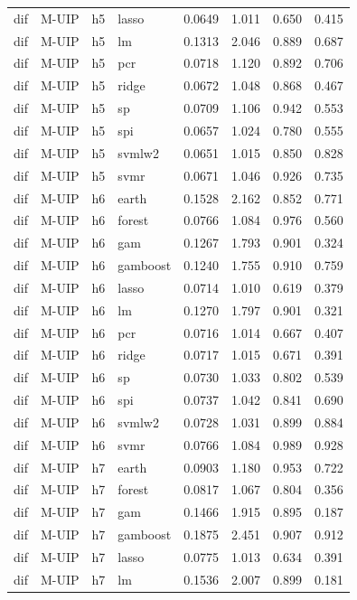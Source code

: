 \begin{ThreePartTable}
\begin{longtable}[t]{llclcccc}
dif & M-UIP & h5 & lasso & 0.0649 & 1.011 & 0.650 & 0.415\\
dif & M-UIP & h5 & lm & 0.1313 & 2.046 & 0.889 & 0.687\\
dif & M-UIP & h5 & pcr & 0.0718 & 1.120 & 0.892 & 0.706\\
dif & M-UIP & h5 & ridge & 0.0672 & 1.048 & 0.868 & 0.467\\
dif & M-UIP & h5 & sp & 0.0709 & 1.106 & 0.942 & 0.553\\
dif & M-UIP & h5 & spi & 0.0657 & 1.024 & 0.780 & 0.555\\
dif & M-UIP & h5 & svmlw2 & 0.0651 & 1.015 & 0.850 & 0.828\\
dif & M-UIP & h5 & svmr & 0.0671 & 1.046 & 0.926 & 0.735\\
\addlinespace
dif & M-UIP & h6 & earth & 0.1528 & 2.162 & 0.852 & 0.771\\
dif & M-UIP & h6 & forest & 0.0766 & 1.084 & 0.976 & 0.560\\
dif & M-UIP & h6 & gam & 0.1267 & 1.793 & 0.901 & 0.324\\
dif & M-UIP & h6 & gamboost & 0.1240 & 1.755 & 0.910 & 0.759\\
dif & M-UIP & h6 & lasso & 0.0714 & 1.010 & 0.619 & 0.379\\
dif & M-UIP & h6 & lm & 0.1270 & 1.797 & 0.901 & 0.321\\
dif & M-UIP & h6 & pcr & 0.0716 & 1.014 & 0.667 & 0.407\\
dif & M-UIP & h6 & ridge & 0.0717 & 1.015 & 0.671 & 0.391\\
dif & M-UIP & h6 & sp & 0.0730 & 1.033 & 0.802 & 0.539\\
dif & M-UIP & h6 & spi & 0.0737 & 1.042 & 0.841 & 0.690\\
dif & M-UIP & h6 & svmlw2 & 0.0728 & 1.031 & 0.899 & 0.884\\
dif & M-UIP & h6 & svmr & 0.0766 & 1.084 & 0.989 & 0.928\\
\addlinespace
dif & M-UIP & h7 & earth & 0.0903 & 1.180 & 0.953 & 0.722\\
dif & M-UIP & h7 & forest & 0.0817 & 1.067 & 0.804 & 0.356\\
dif & M-UIP & h7 & gam & 0.1466 & 1.915 & 0.895 & 0.187\\
dif & M-UIP & h7 & gamboost & 0.1875 & 2.451 & 0.907 & 0.912\\
dif & M-UIP & h7 & lasso & 0.0775 & 1.013 & 0.634 & 0.391\\
dif & M-UIP & h7 & lm & 0.1536 & 2.007 & 0.899 & 0.181\\

\end{longtable}
\end{ThreePartTable}
